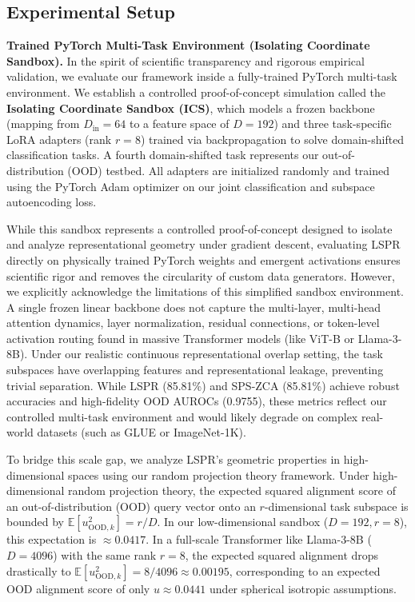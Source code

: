 \subsection{Experimental Setup}
\label{subsec:exp_setup}

\textbf{Trained PyTorch Multi-Task Environment (Isolating Coordinate Sandbox).} In the spirit of scientific transparency and rigorous empirical validation, we evaluate our framework inside a fully-trained PyTorch multi-task environment. We establish a controlled proof-of-concept simulation called the \textbf{Isolating Coordinate Sandbox (ICS)}, which models a frozen backbone (mapping from $D_{\text{in}}=64$ to a feature space of $D=192$) and three task-specific LoRA adapters (rank $r=8$) trained via backpropagation to solve domain-shifted classification tasks. A fourth domain-shifted task represents our out-of-distribution (OOD) testbed. All adapters are initialized randomly and trained using the PyTorch Adam optimizer on our joint classification and subspace autoencoding loss. 

While this sandbox represents a controlled proof-of-concept designed to isolate and analyze representational geometry under gradient descent, evaluating LSPR directly on physically trained PyTorch weights and emergent activations ensures scientific rigor and removes the circularity of custom data generators. However, we explicitly acknowledge the limitations of this simplified sandbox environment. A single frozen linear backbone does not capture the multi-layer, multi-head attention dynamics, layer normalization, residual connections, or token-level activation routing found in massive Transformer models (like ViT-B or Llama-3-8B). Under our realistic continuous representational overlap setting, the task subspaces have overlapping features and representational leakage, preventing trivial separation. While LSPR (85.81\%) and SPS-ZCA (85.81\%) achieve robust accuracies and high-fidelity OOD AUROCs (0.9755), these metrics reflect our controlled multi-task environment and would likely degrade on complex real-world datasets (such as GLUE or ImageNet-1K). 

To bridge this scale gap, we analyze LSPR's geometric properties in high-dimensional spaces using our random projection theory framework. Under high-dimensional random projection theory, the expected squared alignment score of an out-of-distribution (OOD) query vector onto an $r$-dimensional task subspace is bounded by $\mathbb{E}[u_{\text{OOD}, k}^2] = r/D$. In our low-dimensional sandbox ($D=192, r=8$), this expectation is $\approx 0.0417$. In a full-scale Transformer like Llama-3-8B ($D=4096$) with the same rank $r=8$, the expected squared alignment drops drastically to $\mathbb{E}[u_{\text{OOD}, k}^2] = 8/4096 \approx 0.00195$, corresponding to an expected OOD alignment score of only $u \approx 0.0441$ under spherical isotropic assumptions.

